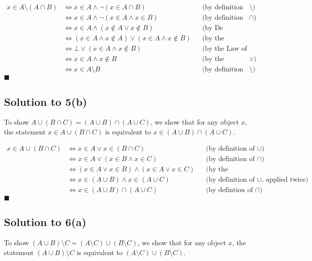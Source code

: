 \documentclass{scrartcl}
\begin{document}
    \begin{align*}
        x \in A \setminus (A \cap B) 
        &\Leftrightarrow x \in A \wedge \neg (x \in A \cap B) 
        && \text{(by definition of $\setminus$)} \\
        &\Leftrightarrow x \in A \wedge \neg (x \in A \wedge x \in B)
        && \text{(by definition of $\cap$)} \\
        &\Leftrightarrow x \in A \wedge (x \notin A \vee x \notin B)
        && \text{(by De Morgan's Law)} \\
        &\Leftrightarrow (x \in A \wedge x \notin A) \vee (x \in A \wedge x \notin B)
        && \text{(by the Distributive Law)} \\
        &\Leftrightarrow \bot \vee (x \in A \wedge x \notin B)
        && \text{(by the Law of Contradiction)} \\
        &\Leftrightarrow x \in A \wedge x \notin B
        && \text{(by the Identity Law for $\vee$)} \\
        &\Leftrightarrow x \in A \setminus B
        && \text{(by definition of $\setminus$)}
    \end{align*}
    \hfill $\blacksquare$


    \subsection*{Solution to 5(b)}
    To show $A \cup (B \cap C) = (A \cup B) \cap (A \cup C)$, we show that for any object $x$, the statement $x \in A \cup (B \cap C)$ is equivalent to $x \in (A \cup B) \cap (A \cup C)$.

    \begin{align*}
        x \in A \cup (B \cap C)
        &\Leftrightarrow x \in A \vee x \in (B \cap C)
        && \text{(by definition of $\cup$)} \\
        &\Leftrightarrow x \in A \vee (x \in B \wedge x \in C)
        && \text{(by definition of $\cap$)} \\
        &\Leftrightarrow (x \in A \vee x \in B) \wedge (x \in A \vee x \in C)
        && \text{(by the Distributive Law)} \\
        &\Leftrightarrow x \in (A \cup B) \wedge x \in (A \cup C)
        && \text{(by definition of $\cup$, applied twice)} \\
        &\Leftrightarrow x \in (A \cup B) \cap (A \cup C)
        && \text{(by defintion of $\cap$)}
    \end{align*}
    \hfill $\blacksquare$

    \subsection*{Solution to 6(a)}
    To show $(A \cup B) \setminus C = (A \setminus C) \cup (B \setminus C)$, we show that for any object $x$, the statement $(A \cup B) \setminus C$ is equivalent to $(A \setminus C) \cup (B \setminus C)$.

    \begin{align*}
    \end{align*}
\end{document}
